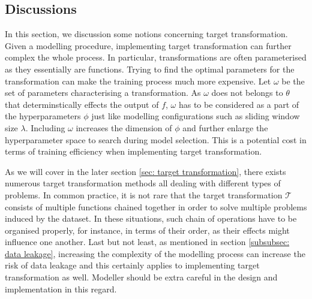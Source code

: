 \subsection{Discussions}
In this section, we discussion some notions concerning target transformation. Given a modelling procedure, implementing target transformation can further complex the whole process. In particular, transformations are often parameterised as they essentially are functions. Trying to find the optimal parameters for the transformation can make the training process much more expensive. Let $\omega$ be the set of parameters characterising a transformation. As $\omega$ does not belongs to $\theta$ that determinstically effects the output of $f$, $\omega$ has to be considered as a part of the hyperparameters $\phi$ just like modelling configurations such as sliding window size $\lambda$. Including $\omega$ increases the dimension of $\phi$ and further enlarge the hyperparameter space to search during model selection. This is a potential cost in terms of training efficiency when implementing target transformation.

As we will cover in the later section \ref{sec: target transformation}, there exists numerous target transformation methods all dealing with different types of problems. In common practice, it is not rare that the target transformation $\mathcal{T}$ consists of multiple functions chained together in order to solve multiple problems induced by the dataset. In these situations, such chain of operations have to be organised properly, for instance, in terms of their order, as their effects might influence one another. Last but not least, as mentioned in section \ref{subsubsec: data leakage}, increasing the complexity of the modelling process can increase the risk of data leakage and this certainly applies to implementing target transformation as well. Modeller should be extra careful in the design and implementation in this regard.
